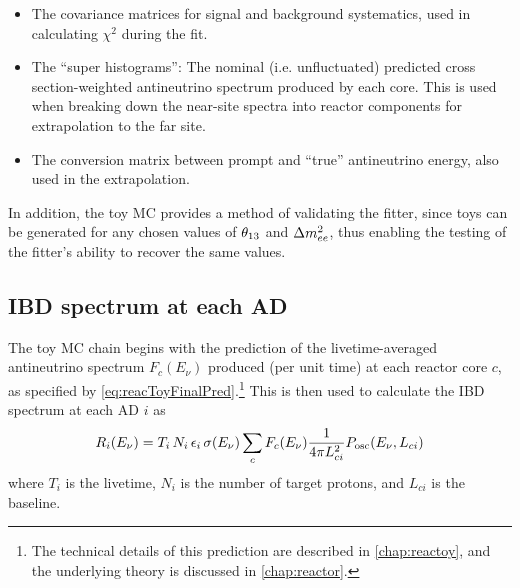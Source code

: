 \documentclass[../thesis.tex]{subfiles}
\begin{document}
\begin{itemize}
\item The covariance matrices for signal and background systematics, used in
  calculating $\chi^2$ during the fit.
\item The ``super histograms'': The nominal (i.e. unfluctuated) predicted cross
  section-weighted antineutrino spectrum produced by each core. This is used
  when breaking down the near-site spectra into reactor components for
  extrapolation to the far site.
\item The conversion matrix between prompt and ``true'' antineutrino energy,
  also used in the extrapolation.
\end{itemize}

In addition, the toy MC provides a method of validating the fitter, since toys
can be generated for any chosen values of $\theta_{13}$ and $\Delta m^2_{ee}$, thus enabling
the testing of the fitter's ability to recover the same values.

\begin{comment}
  The toy MC also generates a ``PredictedIBD'' file which contains the bac
  kground-free no-oscillation IBD spectra of each detector. As far as I can
  tell, this is only used in order to calculate a `summed' covariance matrix in
  which the matrices of the three stages (6, 8, 7AD) are combined, with the
  weighting determined by the PredictedIBD counts. (Oscillations shouldn't
  affect this weighting between ADs in the same hall, or the weighting between
  different stages.) In turn, the summed matrix is not used during the fit, but
  is only produced as a diagnostic.
\end{comment}

\subsection{IBD spectrum at each AD}
\label{sec:fitToyFluxPred}

The toy MC chain begins with the prediction of the livetime-averaged
antineutrino spectrum $F_c(E_\nu)$ produced (per unit time) at each reactor core
$c$, as specified by \autoref{eq:reacToyFinalPred}.\footnote{The technical
  details of this prediction are described in \autoref{chap:reactoy}, and the
  underlying theory is discussed in \autoref{chap:reactor}.} This is then used
to calculate the IBD spectrum at each AD $i$ as
\begin{equation}
  \label{eq:fitTrueIbdSpec}
  R_i(E_\nu) = T_i\,N_i\,\epsilon_i\,\sigma(E_\nu) \sum_c F_c(E_\nu) \frac{1}{4\pi L_{ci}^2}
  P_\mathrm{osc}(E_\nu, L_{ci})
\end{equation}
where $T_i$ is the livetime, $N_i$ is the number of target protons, and $L_{ci}$
is the baseline.
\end{document}
